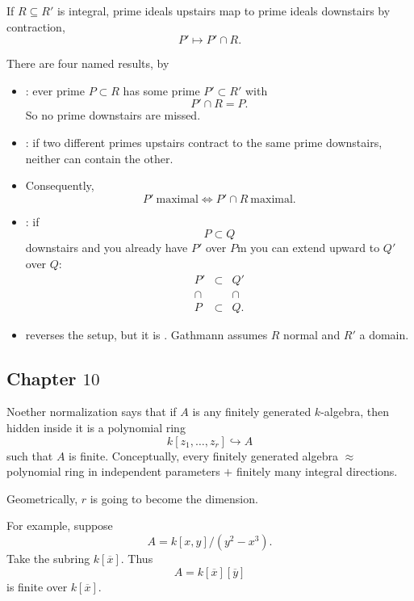\documentclass[11pt]{article}
\begin{document}
If $R \subseteq R'$ is integral, prime 
ideals upstairs map to prime ideals 
downstairs by contraction, 
\[
    P' \mapsto P' \cap R. 
\]

There are four named results, by 
\begin{itemize}
    \item {}: ever prime 
        $P \subset R$ has some prime 
        $P' \subset R'$ with 
        \[
            P' \cap R = P. 
        \]
        So no prime downstairs are missed. 
    \item {}: 
        if two different primes upstairs contract 
        to the same prime downstairs, neither 
        can contain the other. 
    \item Consequently, 
        \[
            P' \ \text{maximal} 
            \Leftrightarrow P' \cap R \ \text{maximal}. 
        \]
    \item {}: 
        if 
        \[
            P \subset Q 
        \]
        downstairs and you already have $P'$ over 
        $P$m you can extend upward to $Q'$ over $Q$: 
        \[
            \begin{array}{ccc}
            P'&\subset&Q'\\
            \cap&&\cap\\
            P&\subset&Q.
            \end{array}
        \]
    \item {} reverses the 
            setup, but it is . 
            Gathmann assumes $R$ normal and 
            $R'$ a domain. 
\end{itemize}

\subsection{Chapter $10$}
Noether normalization says that if $A$ 
is any finitely generated $k$-algebra, then 
hidden inside it is a polynomial ring 
\[
    k[z_1,\dots,z_r]\hookrightarrow A
\]
such that $A$ is finite. 
Conceptually, every finitely generated 
algebra $\approx$ polynomial ring in independent 
parameters $+$ finitely many integral directions. 

Geometrically, $r$ is going to become the dimension. 

For example, suppose 
\[
    A = k[x,y]/(y^2-x^3). 
\]
Take the subring $k[\overline x]$. Thus 
\[
    A = k[\overline x][\overline y]
\]
is finite over $k[\overline x]$. 
\end{document}

